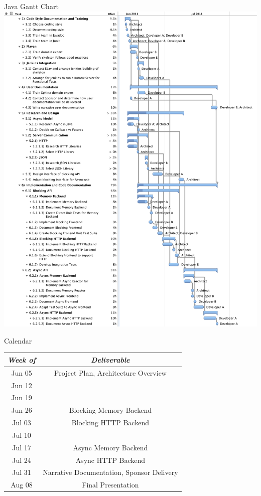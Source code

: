 \documentclass{beamer}
\begin{document}
\begin{frame}{Java Gantt Chart}
  \includegraphics{Java-Gantt.pdf}
\end{frame}

\begin{frame}{Calendar}
  \begin{center}
    \begin{tabular}{|c|c|}
      \hline
      \emph{Week of} & \emph{Deliverable}\\ \hline \hline
      Jun 05 & Project Plan, Architecture Overview\\ \hline
      Jun 12 & \\ \hline
      Jun 19 & \\ \hline
      Jun 26 & Blocking Memory Backend\\ \hline
      Jul 03 & Blocking HTTP Backend\\ \hline
      Jul 10 & \\ \hline
      Jul 17 & Async Memory Backend\\ \hline
      Jul 24 & Async HTTP Backend\\ \hline
      Jul 31 & Narrative Documentation, Sponsor Delivery\\\hline
      Aug 08 & Final Presentation\\ \hline
    \end{tabular}
    \end{center}
\end{frame}
\end{document}
